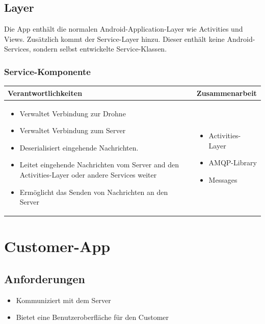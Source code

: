 \subsection{Layer}

Die App enthält die normalen Android-Application-Layer wie Activities und Views. Zusätzlich kommt der Service-Layer hinzu. Dieser enthält keine Android-Services, sondern selbst entwickelte Service-Klassen.

\subsubsection{Service-Komponente}

\begin{tabular}{|p{}|p{}|} \hline
	\textbf{Verantwortlichkeiten} & \textbf{Zusammenarbeit} \\ \hline \hline
	
	\begin{itemize}
		\item Verwaltet Verbindung zur Drohne
		\item Verwaltet Verbindung zum Server
		\item Deserialisiert eingehende Nachrichten.
		\item Leitet eingehende Nachrichten vom Server and den Activities-Layer oder andere Services weiter
		\item Ermöglicht das Senden von Nachrichten an den Server
	\end{itemize}&
	\begin{itemize}
		\item Activities-Layer
		\item AMQP-Library
		\item Messages
	\end{itemize}
	\\ \hline
\end{tabular}


\section{Customer-App}

\subsection{Anforderungen}

\begin{itemize}
	\item Kommuniziert mit dem Server
	\item Bietet eine Benutzeroberfläche für den Customer
\end{itemize}

